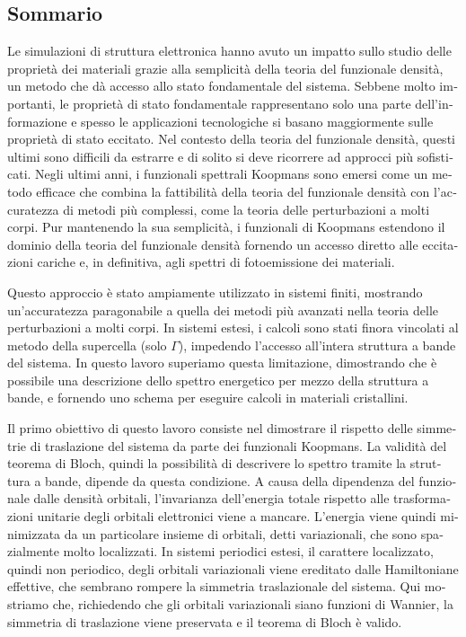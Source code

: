 \begin{otherlanguage}{italian}
\cleardoublepage
\chapter*{Sommario}
\vspace{2cm}
%

Le simulazioni di struttura elettronica hanno avuto un impatto sullo studio delle propriet\`{a} dei materiali grazie alla semplicit\`{a} della teoria del funzionale densit\`{a}, un metodo che d\`{a} accesso allo stato fondamentale del sistema. Sebbene molto importanti, le propriet\`{a} di stato fondamentale rappresentano solo una parte dell'informazione e spesso le applicazioni tecnologiche si basano maggiormente sulle propriet\`{a} di stato eccitato. Nel contesto della teoria del funzionale densit\`{a}, questi ultimi sono difficili da estrarre e di solito si deve ricorrere ad approcci più sofisticati. Negli ultimi anni, i funzionali spettrali Koopmans sono emersi come un metodo efficace che combina la fattibilit\`{a} della teoria del funzionale densit\`{a} con l'accuratezza di metodi più complessi, come la teoria delle perturbazioni a molti corpi. Pur mantenendo la sua semplicit\`{a}, i funzionali di Koopmans estendono il dominio della teoria del funzionale densit\`{a} fornendo un accesso diretto alle eccitazioni cariche e, in definitiva, agli spettri di fotoemissione dei materiali.

Questo approccio \`{e} stato ampiamente utilizzato in sistemi finiti, mostrando un'accuratezza paragonabile a quella dei metodi più avanzati nella teoria delle perturbazioni a molti corpi. In sistemi estesi, i calcoli sono stati finora vincolati al metodo della supercella (solo $\Gamma$), impedendo l'accesso all'intera struttura a bande del sistema. In questo lavoro superiamo questa limitazione, dimostrando che \`{e} possibile una descrizione dello spettro energetico  per mezzo della struttura a bande, e fornendo uno schema per eseguire calcoli in materiali cristallini.

Il primo obiettivo di questo lavoro consiste nel dimostrare il rispetto delle simmetrie di traslazione del sistema da parte dei funzionali Koopmans. La validit\`{a} del teorema di Bloch, quindi la possibilit\`{a} di descrivere lo spettro tramite la struttura a bande, dipende da questa condizione. A causa della dipendenza del funzionale dalle densit\`{a} orbitali, l'invarianza dell'energia totale rispetto alle trasformazioni unitarie degli orbitali elettronici viene a mancare. L'energia viene quindi minimizzata da un particolare insieme di orbitali, detti variazionali, che sono spazialmente molto localizzati. In sistemi periodici estesi, il carattere localizzato, quindi non periodico, degli orbitali variazionali viene ereditato dalle Hamiltoniane effettive, che sembrano rompere la simmetria traslazionale del sistema. Qui mostriamo che, richiedendo che gli orbitali variazionali siano funzioni di Wannier, la simmetria di traslazione viene preservata e il teorema di Bloch \`{e} valido.


\end{otherlanguage}
